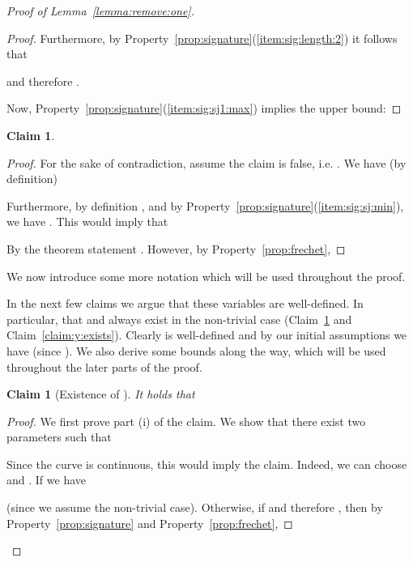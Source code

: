 \documentclass[11pt, letter]{article}
\newtheorem{claim}[theorem]{Claim}
\newcommand{\lemref}[1]{Lemma~\ref{lemma:#1}}
\newcommand{\claimlab}[1]{\label{claim:#1}}
\newcommand{\claimref}[1]{Claim~\ref{claim:#1}}
\newcommand{\propref}[1]{Property~\ref{prop:#1}}
\begin{document}
\begin{proof}[Proof of \lemref{remove:one}]
\begin{proof}
Furthermore, by \propref{signature}(\ref{item:sig:length:2}) it follows that

and therefore   .

Now, \propref{signature}(\ref{item:sig:sj1:max}) implies the upper bound:



\end{proof}


\begin{claim}

\claimlab{no:minimum}
\end{claim}
\begin{proof}
For the sake of contradiction, assume the claim is false, i.e. .
We have (by definition)

Furthermore, by definition 
, and
by \propref{signature}(\ref{item:sig:sj:min}),
we have
.
This would imply that 

By the theorem statement
. 
However, by \propref{frechet},



\end{proof}




We now introduce some more notation which will be used throughout the proof.


In the next few claims we argue that these variables are well-defined. In
particular, that  and  always exist in the non-trivial case
(\claimref{x:exists} and \claimref{y:exists}).  Clearly  is
well-defined and by our initial assumptions we have 
(since ). We also derive some bounds along the way,
which will be used throughout the later parts of the proof.

\begin{claim}[Existence of ]
It holds that
\begin{compactenum}[(i)]
\item 
\item 
\item 
\end{compactenum}
\claimlab{x:exists}
\claimlab{x:high}
\claimlab{sj:low}
\end{claim}
\begin{proof}
We first prove part (i) of the claim.
We show that there exist two parameters
 such that 

Since the curve is continuous, this would imply the claim.
Indeed, we can choose  and  .
If  we have 

(since we assume the non-trivial case). 
Otherwise, if   and therefore , then by \propref{signature} and
\propref{frechet},


\end{proof}
\end{proof}
\end{document}

